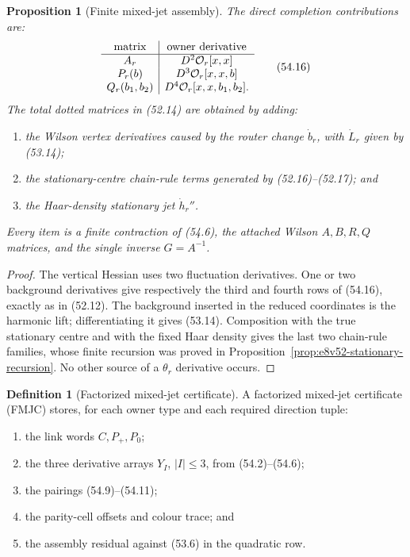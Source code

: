 \documentclass[11pt,oneside]{book}
\newtheorem{proposition}[theorem]{Proposition}
\theoremstyle{definition}
\newtheorem{definition}[theorem]{Definition}
\theoremstyle{remark}
\begin{document}
\begin{proposition}[Finite mixed-jet assembly]
\label{prop:e8v54-mixed-assembly}
The direct completion contributions are:
\[
\begin{array}{c|c}
\text{matrix}&\text{owner derivative}\\ \hline
A_r&D^2{\cal O}_r[x,x]\\
P_r(b)&D^3{\cal O}_r[x,x,b]\\
Q_r(b_1,b_2)&D^4{\cal O}_r[x,x,b_1,b_2].
\end{array}                                                    \tag{54.16}
\]
The total dotted matrices in (52.14) are obtained by adding:
\begin{enumerate}
\item the Wilson vertex derivatives caused by the router change
      \(\dot b_r\), with \(\dot L_r\) given by (53.14);
\item the stationary-centre chain-rule terms generated by
      (52.16)--(52.17); and
\item the Haar-density stationary jet \(\dot h_r''\).
\end{enumerate}
Every item is a finite contraction of (54.6), the attached Wilson
\(A,B,R,Q\) matrices, and the single inverse \(G=A^{-1}\).
\end{proposition}

\begin{proof}
The vertical Hessian uses two fluctuation derivatives.  One or two
background derivatives give respectively the third and fourth
rows of (54.16), exactly as in (52.12).  The background inserted
in the reduced coordinates is the harmonic lift; differentiating
it gives (53.14).  Composition with the true stationary centre and
with the fixed Haar density gives the last two chain-rule families,
whose finite recursion was proved in
Proposition~\ref{prop:e8v52-stationary-recursion}.  No other source
of a \(\theta_r\) derivative occurs.
\end{proof}

\begin{definition}[Factorized mixed-jet certificate]
\label{def:e8v54-FMJC}
A factorized mixed-jet certificate (FMJC) stores, for each owner
type and each required direction tuple:
\begin{enumerate}
\item the link words \(C,P_+,P_0\);
\item the three derivative arrays \(Y_I\), \(|I|\le3\), from
      (54.2)--(54.6);
\item the pairings (54.9)--(54.11);
\item the parity-cell offsets and colour trace; and
\item the assembly residual against (53.6) in the quadratic row.
\end{enumerate}
\end{definition}
\end{document}
